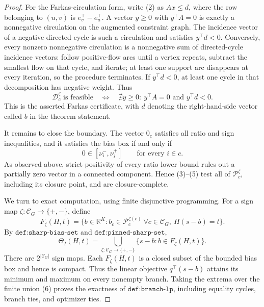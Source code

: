\documentclass{article}
\begin{document}
\begin{proof}
For the Farkas-circulation form, write (2) as \(A x\le d\), where the row belonging to \((u,v)\) is \(e_v^{\top}-e_u^{\top}\).  A vector \(y\ge0\) with \(y^{\top}A=0\) is exactly a nonnegative circulation on the augmented constraint graph.  The incidence vector of a negative directed cycle is such a circulation and satisfies \(y^{\top}d<0\).  Conversely, every nonzero nonnegative circulation is a nonnegative sum of directed-cycle incidence vectors: follow positive-flow arcs until a vertex repeats, subtract the smallest flow on that cycle, and iterate; at least one support arc disappears at every iteration, so the procedure terminates.  If \(y^{\top}d<0\), at least one cycle in that decomposition has negative weight.  Thus
\[
 \mathcal D_c^{\zeta}\text{ is feasible}
 \quad\Longleftrightarrow\quad
 \nexists y\ge0:\ y^{\top}A=0\text{ and }y^{\top}d<0.
\tag{4}
\]
This is the asserted Farkas certificate, with \(d\) denoting the right-hand-side vector called \(b\) in the theorem statement.

It remains to close the boundary.  The vector \(0_c\) satisfies all ratio and sign inequalities, and it satisfies the bias box if and only if
\[
 0\in[\nu_i^-,\nu_i^+]\qquad\text{for every }i\in c.
\tag{5}
\]
As observed above, strict positivity of every ratio lower bound rules out a partially zero vector in a connected component.  Hence (3)--(5) test all of \(\mathcal P_c^{\zeta}\), including its closure point, and are closure-complete.

We turn to exact computation, using finite disjunctive programming.  For a sign map \(\zeta:\mathcal C_G\to\{+,-\}\), define
\[
 F_{\zeta}(H,t)
 =\{b\in\mathbb R^K:b_c\in\mathcal P_c^{\zeta(c)}\ \forall c\in\mathcal C_G,\ H(s-b)=t\}.
\]
By \(\texttt{def:sharp-bias-set}\) and \(\texttt{def:pinned-sharp-set}\),
\[
 \Theta_I(H,t)
 =\bigcup_{\zeta:\mathcal C_G\to\{+,-\}}
   \{s-b:b\in F_{\zeta}(H,t)\}.
\tag{6}
\]
There are \(2^{|\mathcal C_G|}\) sign maps.  Each \(F_{\zeta}(H,t)\) is a closed subset of the bounded bias box and hence is compact.  Thus the linear objective \(q^{\top}(s-b)\) attains its minimum and maximum on every nonempty branch.  Taking the extrema over the finite union (6) proves the exactness of \(\texttt{def:branch-lp}\), including equality cycles, branch ties, and optimizer ties.


\end{proof}
\end{document}
